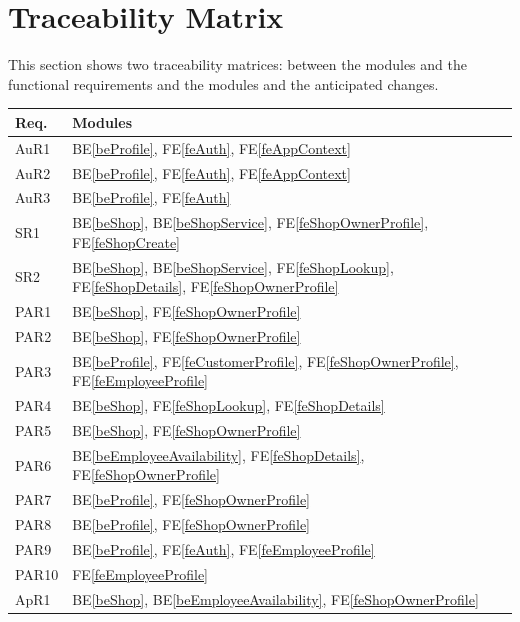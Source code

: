 \documentclass[12pt, titlepage]{article}
\newcommand{\feref}[1]{FE\ref{#1}}
\newcommand{\beref}[1]{BE\ref{#1}}
\begin{document}
\newpage

\section{Traceability Matrix} \label{SecTM}

This section shows two traceability matrices: between the modules and the functional
requirements and the modules and the anticipated changes.

\begin{table}[H]
\centering
\begin{tabular}{p{} p{}}
\toprule
\textbf{Req.} & \textbf{Modules}\\
\midrule
AuR1 & \beref{beProfile}, \feref{feAuth}, \feref{feAppContext} \\
AuR2 & \beref{beProfile}, \feref{feAuth}, \feref{feAppContext} \\
AuR3 & \beref{beProfile}, \feref{feAuth} \\
SR1 & \beref{beShop}, \beref{beShopService}, \feref{feShopOwnerProfile}, \feref{feShopCreate}\\
SR2 & \beref{beShop}, \beref{beShopService}, \feref{feShopLookup}, \feref{feShopDetails}, \feref{feShopOwnerProfile} \\
PAR1 & \beref{beShop}, \feref{feShopOwnerProfile} \\
PAR2 & \beref{beShop}, \feref{feShopOwnerProfile} \\
PAR3 & \beref{beProfile}, \feref{feCustomerProfile}, \feref{feShopOwnerProfile}, \feref{feEmployeeProfile} \\
PAR4 & \beref{beShop}, \feref{feShopLookup}, \feref{feShopDetails} \\
PAR5 & \beref{beShop}, \feref{feShopOwnerProfile} \\
PAR6 & \beref{beEmployeeAvailability}, \feref{feShopDetails}, \feref{feShopOwnerProfile}\\
PAR7 & \beref{beProfile}, \feref{feShopOwnerProfile} \\
PAR8 & \beref{beProfile}, \feref{feShopOwnerProfile} \\
PAR9 & \beref{beProfile}, \feref{feAuth}, \feref{feEmployeeProfile} \\
PAR10 & \feref{feEmployeeProfile} \\
ApR1 & \beref{beShop}, \beref{beEmployeeAvailability}, \feref{feShopOwnerProfile} \\

\end{tabular}
\end{table}
\end{document}
